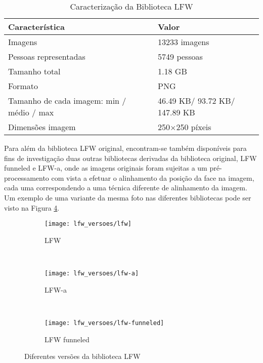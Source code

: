 \begin{center}
\begin{table}
	\caption{Caracterização da Biblioteca LFW}
	\begin{center}
    \begin{tabular}{ll}
    \hline
    Característica                            & Valor            \\ \hline
    Imagens                                   & 13233 imagens    \\
    Pessoas representadas                     & 5749 pessoas     \\
    Tamanho total                             & 1.18 GB          \\
    Formato                                   & PNG              \\
    Tamanho de cada imagem: min / médio / max & 46.49 KB/ 93.72 KB/ 147.89 KB\\
    Dimensões imagem                          & 250$\times$250 píxeis \\
    \hline
    \end{tabular}
	\label{tab:lfw}
	\end{center}
\end{table}
\end{center}

Para além da biblioteca LFW original, encontram-se também disponíveis para fins de investigação duas outras bibliotecas derivadas da biblioteca original, LFW funneled e LFW-a, onde as imagens originais foram sujeitas a um pré-processamento com vista a efetuar o alinhamento da posição da face na imagem, cada uma correspondendo a uma técnica diferente de alinhamento da imagem. Um exemplo de uma variante da mesma foto nas diferentes bibliotecas pode ser visto na Figura \ref{fig:lfwversoes}.

\begin{figure}[h]
        \centering
        \begin{subfigure}[b]{0.25\textwidth}
                \centering
                \texttt{[image: lfw\_versoes/lfw]}
                \caption{LFW}
                \label{fig:lfw_original}
        \end{subfigure}%
        ~ 
        \begin{subfigure}[b]{0.25\textwidth}
                \centering
                \texttt{[image: lfw\_versoes/lfw-a]}
                \caption{LFW-a}
                \label{fig:lfw_a}
        \end{subfigure}
        ~ 
        \begin{subfigure}[b]{0.25\textwidth}
                \centering
                \texttt{[image: lfw\_versoes/lfw-funneled]}
                \caption{LFW funneled}
                \label{fig:lfw_funneled}
        \end{subfigure}
        \caption{Diferentes versões da biblioteca LFW}\label{fig:lfwversoes}
\end{figure}

